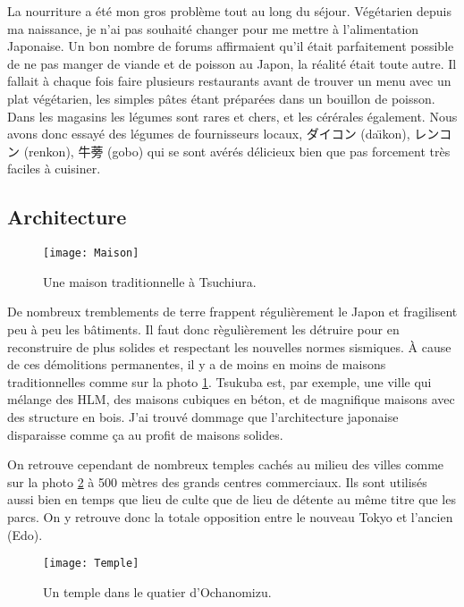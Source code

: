 \documentclass[11pt,journal]{RapportFR}
\begin{document}
\begin{CJK*}{UTF8}{min}
La nourriture a \'et\'e mon gros probl\`eme tout au long du s\'ejour. V\'eg\'etarien depuis ma naissance, je n'ai pas souhait\'e changer pour me mettre \`a l'alimentation Japonaise. Un bon nombre de forums affirmaient qu'il \'etait parfaitement possible de ne pas manger de viande et de poisson au Japon, la r\'ealit\'e \'etait toute autre. Il fallait \`a chaque fois faire plusieurs restaurants avant de trouver un menu avec un plat v\'eg\'etarien, les simples p\^ates \'etant pr\'epar\'ees dans un bouillon de poisson.
Dans les magasins les l\'egumes sont rares et chers, et les c\'er\'erales \'egalement. Nous avons donc essay\'e des l\'egumes de fournisseurs locaux, ダイコン (da\"\i kon),  レンコン  (renkon), 牛蒡 (gobo) qui se sont av\'er\'es d\'elicieux bien que pas forcement tr\`es faciles \`a cuisiner.



\subsection{Architecture}

\begin{figure}[!t]
\centering
\texttt{[image: Maison]}
\caption{Une maison traditionnelle \`a Tsuchiura.}
\label{fig_maison}
\end{figure} 

De nombreux tremblements de terre frappent r\'eguli\`erement le Japon et fragilisent peu \`a peu les b\^atiments. Il faut donc r\`eguli\`erement les d\'etruire pour en reconstruire de plus solides et respectant les nouvelles normes sismiques.
\`A cause de ces d\'emolitions permanentes, il y a de moins en moins de maisons traditionnelles comme sur la photo \ref{fig_maison}. Tsukuba est, par exemple, une ville qui m\'elange des HLM, des maisons cubiques en b\'eton, et de magnifique maisons avec des structure en bois. J'ai trouv\'e dommage que l'architecture japonaise disparaisse comme \c{c}a au profit de maisons solides.


On retrouve cependant de nombreux temples cach\'es au milieu des villes comme sur la photo \ref{fig_temple} \`a 500 m\`etres des grands centres commerciaux. Ils sont utilis\'es aussi bien en temps que lieu de culte que de lieu de d\'etente au m\^eme titre que les parcs. On y retrouve donc la totale opposition entre le nouveau Tokyo et l'ancien (Edo). 

\begin{figure}[!t]
\centering
\texttt{[image: Temple]}
\caption{Un temple dans le quatier d'Ochanomizu.}
\label{fig_temple}
\end{figure}



\end{CJK*}
\end{document}
